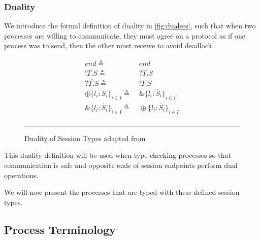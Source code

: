 \subsubsection{Duality} We introduce the formal definition of duality in \autoref{fig:dualses}, such that when two processes are willing to communicate, they must agree on a protocol as if one process was to send, then the other must receive to avoid deadlock.

\begin{figure}[h]
    \centering
    \begin{equation*}
        \begin{split}
            \overline{end} \triangleq & \;end \\
            \overline{!T.S} \triangleq & \;?T.S \\
            \overline{?T.S} \triangleq & \;!T.S \\
            \overline{\oplus \{l_i : S_i\}_{i \in I}} \triangleq & \; \&\{l_i : \overline{S}_i\}_{i \in I} \\
            \overline{\&\{l_i : S_i\}_{i \in I}} \triangleq & \; \oplus \{l_i : \overline{S}_i\}_{i \in I}\\
        \end{split}
    \end{equation*}
    \noindent\rule{12cm}{0.8pt}
    \caption{Duality of Session Types adapted from \citep{dardha2017session}}
    \label{fig:dualses}
\end{figure}

This duality definition will be used when type checking processes so that communication is safe and opposite ends of session endpoints perform dual operations.



 
We will now present the processes that are typed with these defined session types.

\subsection{Process Terminology}

